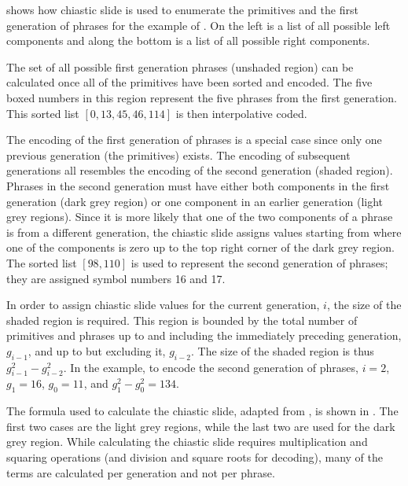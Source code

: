  shows how chiastic slide is used to 
enumerate the primitives and the first generation of phrases for 
the example of .  On the left is a list
of all possible left components and along the bottom is a list
of all possible right components.  



The set of all possible first generation phrases (unshaded region)
can be calculated once all of the primitives have been sorted
and encoded.  The five boxed numbers in this region represent the
five phrases from the first generation.  This sorted list 
$[0, 13, 45, 46, 114]$ is then interpolative coded.

The encoding of the first generation of phrases is a special
case since only one previous generation (the primitives) 
exists.  The encoding of subsequent generations all
resembles the encoding of the second generation (shaded region).
Phrases in the second generation must have either both
components in the first generation (dark grey region) or one
component in an earlier generation (light grey regions).
Since it is more likely that one of the two components of a
phrase is from a different generation, the chiastic slide assigns 
values starting from where one of the components is zero up to
the top right corner of the dark grey region.  The sorted list
$[98, 110]$ is used to represent the second generation of 
phrases; they are assigned symbol numbers 16 and 17.

In order to assign chiastic slide values for the current generation, 
$i$, the size of the shaded region is required.  This region is bounded
by the total number of primitives and phrases up to and including 
the immediately preceding generation, $g_{i-1}$, and up to but
excluding it, $g_{i-2}$.  The size of the shaded region is thus
$g^2_{i-1} - g^2_{i-2}$.  In the example, to encode the second
generation of phrases, $i = 2$, $g_{1} = 16$, $g_{0} = 11$, and
$g^2_{1} - g^2_{0} = 134$.


The formula used to calculate the chiastic slide, adapted from 
\citeauthor{lm00:procieee}, is shown in .  The first 
two cases are the light grey regions, while the last 
two are used for the dark grey region.  While calculating
the chiastic slide requires multiplication and squaring operations
(and division and square roots for decoding),
many of the terms are calculated per generation
and not per phrase.


